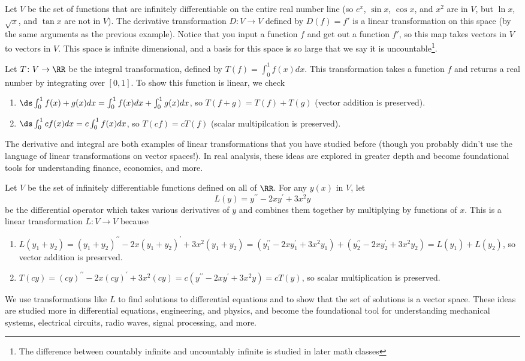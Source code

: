 \begin{example}
Let $V$ be the set of functions that are infinitely differentiable on the entire real number line (so $e^x$, $\sin x$, $\cos x$, and $x^2$ are in $V$, but $\ln x$, $\sqrt{x}$, and $\tan x$ are not in $V$). 
The derivative transformation $D\colon V\to V$ defined by $D(f) = f'$ is a linear transformation on this space (by the same arguments as the previous example). Notice that you input a function $f$ and get out a function $f'$, so this map takes vectors in $V$ to vectors in $V$.  This space is infinite dimensional, and a basis for this space is so large that we say it is uncountable\footnote{The difference between countably infinite and uncountably infinite is studied in later math classes}.

Let $T\colon V\to \RR$ be the integral transformation, defined by $T(f)=\int_0^1 f(x)dx$.  This transformation takes a function $f$ and returns a real number by integrating over $[0,1]$.  To show this function is linear, we check
\begin{enumerate}
	\item $\ds \int_0^1 f(x)+g(x)dx=\int_0^1 f(x)dx+\int_0^1 g(x)dx$, so $T(f+g)= T(f)+T(g)$ (vector addition is preserved).
	\item $\ds \int_0^1 cf(x)dx =c\int_0^1 f(x)dx$, so $T(cf) = cT(f)$ (scalar multipilcation is preserved).
\end{enumerate}
The derivative and integral are both examples of linear transformations that you have studied before (though you probably didn't use the language of linear transformations on vector spaces!). In real analysis, these ideas are explored in greater depth and become foundational tools for understanding finance, economics, and more.
\end{example}

\begin{example}
Let $V$ be the set of infinitely differentiable functions defined on all of $\RR$.  For any $y(x)$ in $V$, let $$L(y)=y^{\prime\prime}-2xy^\prime+3x^2 y$$ be the differential operator which takes various derivatives of $y$ and combines them together by multiplying by functions of $x$.  This is a linear transformation $L\colon V\to V$ because 
\begin{enumerate}
	\item $L(y_1+y_2)=(y_1+y_2)^{\prime\prime}-2x(y_1+y_2)^\prime+3x^2 (y_1+y_2) = (y_1^{\prime\prime}-2xy_1^\prime+3x^2 y_1) +(y_2^{\prime\prime}-2xy_2^\prime+3x^2 y_2)=L(y_1)+L(y_2)$, so vector addition is preserved.
	\item $T(cy)=(cy)^{\prime\prime}-2x(cy)^\prime+3x^2 (cy) = c(y^{\prime\prime}-2xy^\prime+3x^2 y)=cT(y)$, so scalar multiplication is preserved.
\end{enumerate}
 We use transformations like $L$ to find solutions to differential equations and to show that the set of solutions is a vector space. These ideas are studied more in differential equations, engineering, and physics, and become the foundational tool for understanding mechanical systems, electrical circuits, radio waves, signal processing, and more.  
\end{example}




